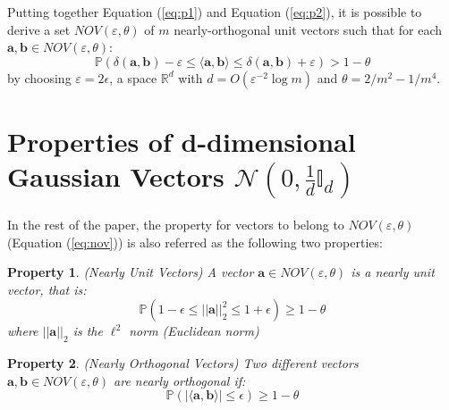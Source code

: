 \documentclass[twoside,11pt]{article}
\def\vec#1{\mathbf{#1}}
\def\svec#1{\vec{#1}}
\def\R{\mathbb{R}}
\def\P{\mathbb{P}}
\def\dotprod#1#2{\langle#1,#2\rangle}
\newcounter{properties}
\newtheorem{property}{Property}
\def\finalcomment#1#2{}
\begin{document}
Putting together Equation (\ref{eq:p1}) and Equation (\ref{eq:p2}), it is possible to derive a set $NOV(\varepsilon,\theta)$ of $m$ nearly-orthogonal unit vectors such that for each $\vec{a},\vec{b}\in NOV(\varepsilon,\theta)$:
$$\P(\delta(\vec{a},\vec{b}) - \varepsilon \leq \dotprod{\vec{a}}{\vec{b}} \leq \delta(\vec{a},\vec{b}) + \varepsilon) > 1 -\theta$$
by choosing $\varepsilon = 2\epsilon$, a space $\R^d$ with $d=O(\varepsilon^{-2}\log{m})$ and $\theta = 2/m^2 - 1/m^4$.



\section{Properties of d-dimensional Gaussian Vectors $\mathcal{N}(0,\frac{1}{d}\mathbb{I}_d)$}
\label{properties_of_normal_vectors}


In the rest of the paper, the property for vectors to belong to $NOV(\varepsilon,\theta)$ (Equation (\ref{eq:nov})) is also referred as the following two properties:
\finalcomment{$|| g || = 1$: in which norm?}{R3.5}
\begin{property}\label{near_norm}
\emph{(Nearly Unit Vectors)}
A vector $\svec{a} \in NOV(\varepsilon,\theta)$ is a nearly unit vector, that is:
$$\P(1 - \epsilon \leq ||\svec{a}||^2_2 \leq 1 + \epsilon) \geq 1-\theta$$
where $||\svec{a}||_2$ is the ${\ell}^2$ norm (Euclidean norm)
\end{property}
\begin{property}\label{near_orth}\emph{(Nearly Orthogonal Vectors)}
Two different vectors $\vec{a},\vec{b}\in NOV(\varepsilon,\theta)$ are nearly orthogonal if: 
$$\P(| \dotprod{\svec a}{\svec b}| \leq \epsilon) \geq 1-\theta$$ 
\end{property}
\end{document}
